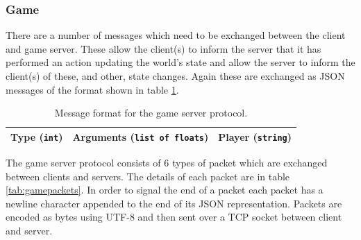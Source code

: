 \documentclass[12pt,notitlepage,a4paper]{report}
\begin{document}
	\subsubsection{Game}
	There are a number of messages which need to be exchanged between the client and game server. These allow the client(s) to inform the server that it has performed an action updating the world's state and allow the server to inform the client(s) of these, and other, state changes. Again these are exchanged as JSON messages of the format shown in table \ref{tab:gameprotocol}.
	\begin{table}
		\centering
		\begin{tabularx}{0.85\textwidth}{| l | l | X |}
			\hline
			Type (\texttt{int}) & Arguments (\texttt{list of floats}) & Player (\texttt{string})\\
			\hline
		\end{tabularx}
		\caption{Message format for the game server protocol.}
		\label{tab:gameprotocol}
	\end{table}

	The game server protocol consists of $6$ types of packet which are exchanged between clients and servers. The details of each packet are in table \ref{tab:gamepackets}. In order to signal the end of a packet each packet has a newline character appended to the end of its JSON representation. Packets are encoded as bytes using UTF-8 and then sent over a TCP socket between client and server.
\end{document}
